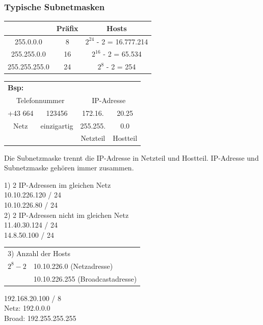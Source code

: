 \subsubsection*{Typische Subnetmasken}
\begin{table}[H]
	\begin{tabular}{c|c|c}
		& Präfix & Hosts \\
		\hline
		255.0.0.0 & 8 & $2^{24}$ - 2 = 16.777.214 \\
		\hline
		255.255.0.0 & 16 & $2^{16}$ - 2 = 65.534 \\
		\hline
		255.255.255.0 & 24 & $2^{8}$ - 2 = 254
	\end{tabular}
\end{table}
\begin{table}[H]
	\begin{tabular}{cc|cc}
		\multicolumn{4}{l}{\textbf{Bsp:}} \\
		\multicolumn{2}{c}{Telefonnummer} & \multicolumn{2}{c}{IP-Adresse} \\
		+43 664 & 123456 & 172.16. & 20.25 \\
		Netz & einzigartig & 255.255. & 0.0 \\
		 & & Netzteil & Hostteil
	\end{tabular}
\end{table}
Die Subnetzmaske trennt die IP-Adresse in Netzteil und Hostteil. IP-Adresse und Subnetzmaske gehören immer zusammen.

1) 2 IP-Adressen im gleichen Netz \\
10.10.226.120 / 24 \\
10.10.226.80 / 24 \\

2) 2 IP-Adressen nicht im gleichen Netz \\
11.40.30.124 / 24 \\
14.8.50.100 / 24 \\

\begin{table}[H]
	\begin{tabular}{ll}
		\multicolumn{2}{l}{3) Anzahl der Hosts} \\
		$2^{8} - 2$ & 10.10.226.0 (Netzadresse)\\
		& 10.10.226.255 (Broadcastadresse)\\
	\end{tabular}
\end{table}

192.168.20.100 / 8 \\
Netz:  192.0.0.0 \\
Broad: 192.255.255.255


